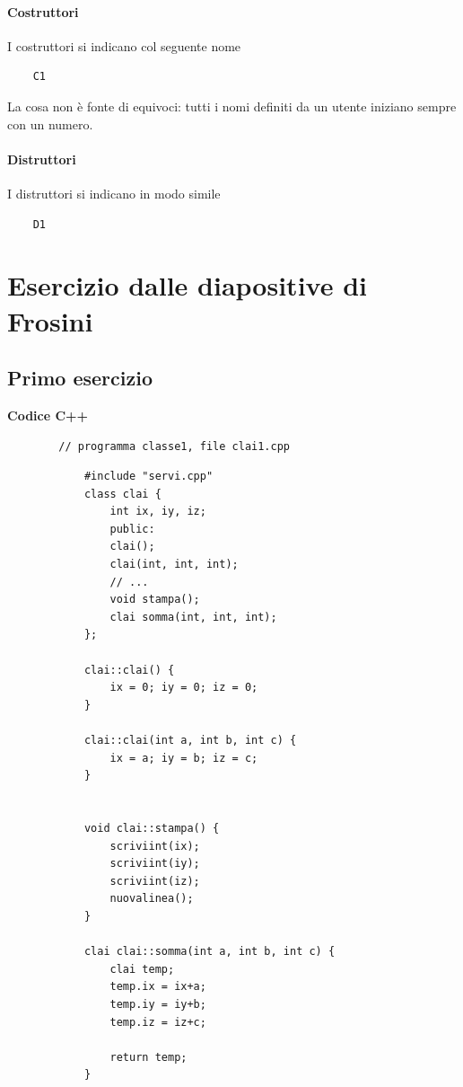 \paragraph{Costruttori} I costruttori si indicano col seguente nome
\begin{verbatim}
	C1
\end{verbatim}
La cosa non è fonte di equivoci: tutti i nomi definiti da un utente iniziano sempre con un numero.
\paragraph{Distruttori} I distruttori si indicano in modo simile
\begin{verbatim}
	D1
\end{verbatim}

\section{Esercizio dalle diapositive di Frosini}
\begingroup
\small
\subsection{Primo esercizio}
\begin{framed}
	\noindent \textbf{Codice C++}
	\begin{verbatim}
		// programma classe1, file clai1.cpp
	\end{verbatim}
	\begin{multicols}{2}
		\begin{verbatim}
			#include "servi.cpp"
			class clai { 
				int ix, iy, iz;
				public:
				clai();
				clai(int, int, int);
				// ...
				void stampa();
				clai somma(int, int, int);
			};
			
			clai::clai() { 
				ix = 0; iy = 0; iz = 0;
			}
			
			clai::clai(int a, int b, int c) { 
				ix = a; iy = b; iz = c;
			}
			
			
			void clai::stampa() { 
				scriviint(ix); 
				scriviint(iy); 
				scriviint(iz);
				nuovalinea();
			}
			
			clai clai::somma(int a, int b, int c) { 
				clai temp;
				temp.ix = ix+a;
				temp.iy = iy+b;
				temp.iz = iz+c;
				
				return temp;
			}
		\end{verbatim}
	\end{multicols}
\end{framed}
